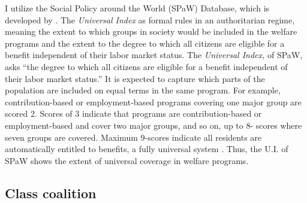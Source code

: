 \documentclass[12pt, letterpage, notitlepage]{article}
\begin{document}
I utilize the Social Policy around the World (SPaW) Database, which is developed by \citet{Rasmussen2016}. The \textit{Universal Index} as formal rules in an authoritarian regime, meaning the extent to which groups in society would be included in the welfare programs and the extent to the degree to which all citizens are eligible for a benefit independent of their labor market status. The \textit{Universal Index,} of SPaW, asks ``the degree to which all citizens are eligible for a benefit independent of their labor market status.'' It is expected to capture which parts of the population are included on equal terms in the same program. For example, contribution-based or employment-based programs covering one major group are scored 2. Scores of 3 indicate that programs are contribution-based or employment-based and cover two major groups, and so on, up to 8- scores where seven groups are covered. Maximum 9-scores indicate all residents are automatically entitled to benefits, a fully universal system \citep{Rasmussen2016,Rasmussen2019}. Thus, the U.I. of SPaW shows the extent of universal coverage in welfare programs.



\subsection{Class coalition}
\end{document}
